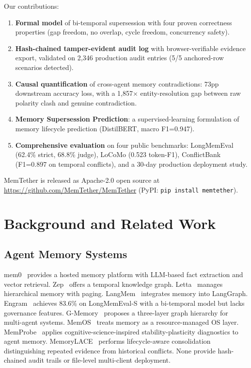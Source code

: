 \documentclass[11pt]{article}
\begin{document}
Our contributions:
\begin{enumerate}
\item \textbf{Formal model} of bi-temporal supersession with four proven correctness properties (gap freedom, no overlap, cycle freedom, concurrency safety).
\item \textbf{Hash-chained tamper-evident audit log} with browser-verifiable evidence export, validated on 2{,}346 production audit entries (5/5 anchored-row scenarios detected).
\item \textbf{Causal quantification} of cross-agent memory contradictions: 73pp downstream accuracy loss, with a 1{,}857$\times$ entity-resolution gap between raw polarity clash and genuine contradiction.
\item \textbf{Memory Supersession Prediction}: a supervised-learning formulation of memory lifecycle prediction (DistilBERT, macro F1=0.947).
\item \textbf{Comprehensive evaluation} on four public benchmarks: LongMemEval (62.4\% strict, 68.8\% judge), LoCoMo (0.523 token-F1), ConflictBank (F1=0.897 on temporal conflicts), and a 30-day production deployment study.
\end{enumerate}

MemTether is released as Apache-2.0 open source at \url{https://github.com/MemTether/MemTether} (PyPI: \texttt{pip install memtether}).

\section{Background and Related Work}
\label{sec:related}

\subsection{Agent Memory Systems}
mem0~\citep{mem0} provides a hosted memory platform with LLM-based fact extraction and vector retrieval. Zep~\citep{zep} offers a temporal knowledge graph. Letta~\citep{letta} manages hierarchical memory with paging. LangMem~\citep{langmem} integrates memory into LangGraph. Engram~\citep{engram} achieves 83.6\% on LongMemEval-S with a bi-temporal model but lacks governance features. G-Memory~\citep{gmotion} proposes a three-layer graph hierarchy for multi-agent systems. MemOS~\cite{memos} treats memory as a resource-managed OS layer. MemProbe~\cite{memprobe} applies cognitive-science-inspired stability-plasticity diagnostics to agent memory. MemoryLACE~\cite{memorylace} performs lifecycle-aware consolidation distinguishing repeated evidence from historical conflicts. None provide hash-chained audit trails or file-level multi-client deployment.
\end{document}

